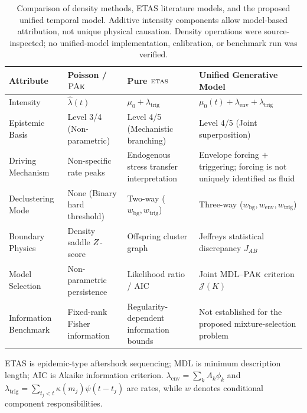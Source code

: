 \begin{landscape}
  \begin{table}[htbp]
    \centering
    \small
    \begin{threeparttable}
      \caption{Comparison of density methods, ETAS literature models, and
        the proposed unified temporal model. Additive intensity components
        allow model-based attribution, not unique physical causation.
        Density operations were source-inspected; no unified-model
      implementation, calibration, or benchmark run was verified.}
      \label{tab:model_comparison_chapter8}
      \begin{tabularx}{\linewidth}{>{\raggedright\arraybackslash}X
          >{\raggedright\arraybackslash}X >{\raggedright\arraybackslash}X
        >{\raggedright\arraybackslash}X}
        \toprule
        \textbf{Attribute} & \textbf{Poisson / $\textsc{PAk}$} & \textbf{Pure
        $\textsc{etas}$} & \textbf{Unified Generative Model} \\
        \midrule
        Intensity & $\hat\lambda(t)$ & $\mu_0+\lambda_{\mathrm{trig}}$ &
        $\mu_0(t)+\lambda_{\mathrm{env}}+\lambda_{\mathrm{trig}}$ \\
        Epistemic Basis & Level 3/4 (Non-parametric) & Level 4/5
        (Mechanistic branching) & Level 4/5 (Joint superposition) \\
        Driving Mechanism & Non-specific rate peaks & Endogenous stress
        transfer interpretation & Envelope forcing $+$ triggering;
        forcing is not uniquely identified as fluid \\
        Declustering Mode & None (Binary hard threshold) & Two-way
        ($w_{\mathrm{bg}}, w_{\mathrm{trig}}$) & Three-way
        ($w_{\mathrm{bg}}, w_{\mathrm{env}}, w_{\mathrm{trig}}$) \\
        Boundary Physics & Density saddle $Z$-score & Offspring
        cluster graph & Jeffreys statistical discrepancy $J_{AB}$ \\
        Model Selection & Non-parametric persistence & Likelihood ratio
        / $\mathrm{AIC}$ & Joint $\mathrm{MDL}$--$\textsc{PAk}$ criterion
        $\mathcal{J}(K)$ \\
        Information Benchmark & Fixed-rank Fisher information &
        Regularity-dependent information bounds & Not established
        for the proposed mixture-selection problem \\
        \bottomrule
      \end{tabularx}
      \begin{tablenotes}[flushleft]
        \footnotesize
      \item [Literature Baseline / Proposal] ETAS is epidemic-type
        aftershock sequencing; MDL is minimum description length;
        AIC is Akaike information criterion. $\lambda_{\mathrm{env}}
        =\sum_kA_k\phi_k$ and $\lambda_{\mathrm{trig}}
        =\sum_{t_j<t}\kappa(m_j)\psi(t-t_j)$ are rates, while
        $w$ denotes conditional component responsibilities.
      \end{tablenotes}
    \end{threeparttable}
  \end{table}
\end{landscape}

